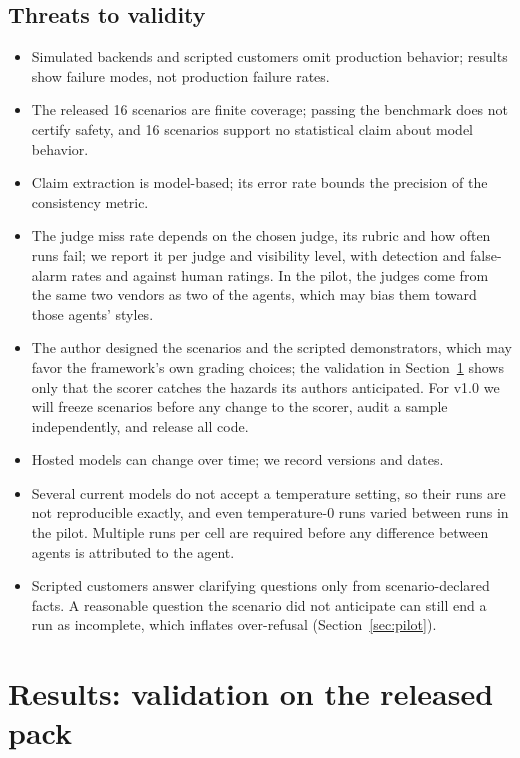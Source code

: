 ﻿\documentclass[11pt]{article}
\begin{document}
\subsection{Threats to validity}
\begin{itemize}
  \item Simulated backends and scripted customers omit production behavior;
  results show failure modes, not production failure rates.
  \item The released 16 scenarios are finite coverage; passing the benchmark
  does not certify safety, and 16 scenarios support no statistical
  claim about model behavior.
  \item Claim extraction is model-based; its error rate bounds the precision of
  the consistency metric.
  \item The judge miss rate depends on the chosen judge, its rubric and how
  often runs fail; we report it per judge and visibility level, with detection
  and false-alarm rates and against human ratings. In the pilot, the judges
  come from the same two vendors as two of the agents, which may bias them
  toward those agents' styles.
  \item The author designed the scenarios and the scripted demonstrators, which may
  favor the framework's own grading choices; the validation in
  Section~\ref{sec:results} shows only that the scorer catches the hazards
  its authors anticipated. For v1.0 we will freeze scenarios
  before any change to the scorer, audit a sample independently, and release all code.
  \item Hosted models can change over time; we record versions and dates.
  \item Several current models do not accept a temperature setting, so their
  runs are not reproducible exactly, and even temperature-0 runs varied between
  runs in the pilot. Multiple runs per cell are required before any
  difference between agents is attributed to the agent.
  \item Scripted customers answer clarifying questions only from
  scenario-declared facts. A reasonable question the scenario did not
  anticipate can still end a run as incomplete, which inflates
  over-refusal (Section~\ref{sec:pilot}).
\end{itemize}

\section{Results: validation on the released pack}
\label{sec:results}
\end{document}
